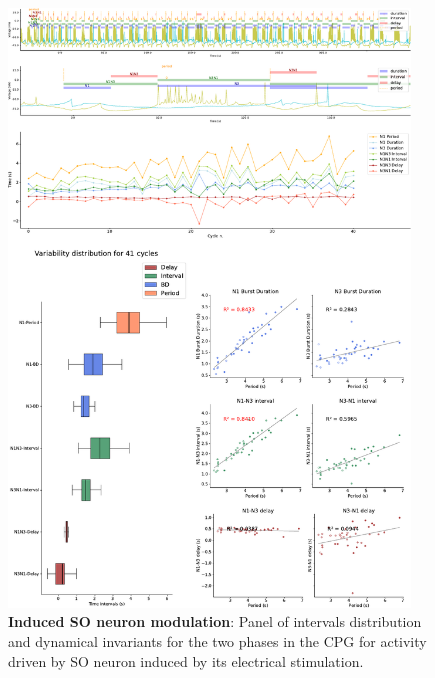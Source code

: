 \begin{figure}[htbp]
	\centering
	\includegraphics[width=0.95\textwidth]{./img/invariants/data/SUSSEX/SO_driven/images/panel_with_intervals.pdf}
	\caption{\textbf{Induced SO neuron modulation}: Panel of intervals distribution and dynamical invariants for the two phases in the CPG for activity driven by SO neuron induced by its electrical stimulation.}
	\label{fig:so induced invariants}
\end{figure}


